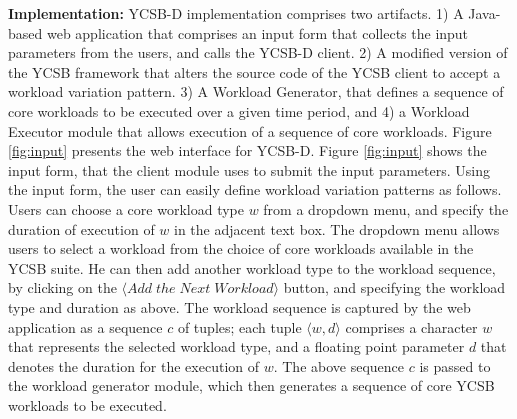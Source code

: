 \documentclass[conference]{IEEEtran}
\begin{document}

\par \textbf{Implementation:}
 \def\tuple#1{\langle #1\rangle}
  YCSB-D implementation comprises two artifacts.
  1) A Java-based web application that comprises an input form that collects the input parameters from the users, and calls the YCSB-D client.
   2) A modified version of the YCSB framework that alters the source code of the YCSB client to accept a workload variation pattern.
       3) A Workload Generator, that defines a sequence of core workloads to be executed over a given time period, and 4) a Workload Executor module that allows execution of a sequence of core workloads. %
        Figure \ref{fig:input} presents the web interface for YCSB-D. Figure \ref{fig:input} shows the input form, that the client module uses to submit the input parameters.
         Using the input form, the user can easily define workload variation patterns as follows. Users can choose a core workload type $w$ from a dropdown menu, and specify the duration of execution of $w$ in the adjacent text box. The dropdown menu allows users to select a workload from the choice of core workloads available in the YCSB suite. He can then add another workload type to the workload sequence, by clicking on the $\langle Add\; the\; Next\; Workload\rangle$ button, and specifying the workload type and duration as above. The workload sequence is captured by the web application as a sequence $c$ of tuples; each tuple $\tuple{w,d}$ comprises a character $w$ that represents the selected workload type, and a floating point parameter $d$ that denotes the duration for the execution of $w$. The above sequence $c$ is passed to the workload generator module, which then generates a sequence of core YCSB workloads to be executed.
\end{document}
